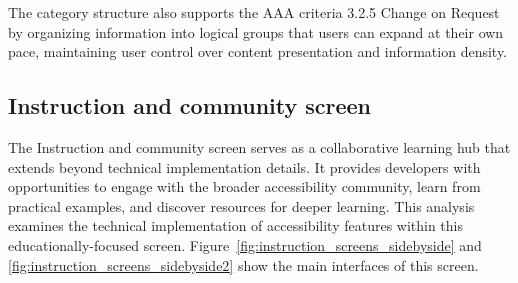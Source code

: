 The category structure also supports the AAA criteria 3.2.5 Change on Request by organizing information into logical groups that users can expand at their own pace, maintaining user control over content presentation and information density.

\subsection{Instruction and community screen}
\label{subsec:instruction-community}

The Instruction and community screen serves as a collaborative learning hub that extends beyond technical implementation details. It provides developers with opportunities to engage with the broader accessibility community, learn from practical examples, and discover resources for deeper learning. This analysis examines the technical implementation of accessibility features within this educationally-focused screen.
Figure~\ref{fig:instruction_screens_sidebyside} and \ref{fig:instruction_screens_sidebyside2} show the main interfaces of this screen.

